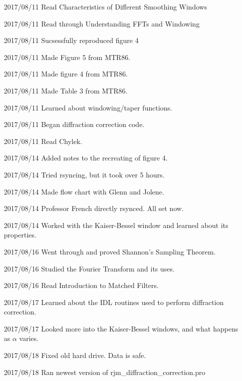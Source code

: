 \documentclass[crop=false,class=article,oneside]{standalone}
\begin{document}
\begin{enumerate}[leftmargin=55pt]
            \item[2017/08/11] Read Characteristics of
                              Different Smoothing Windows
            \item[2017/08/11] Read through Understanding FFTs
                              and Windowing
            \item[2017/08/11] Sucsessfully reproduced figure 4
            \item[2017/08/11] Made Figure 5 from MTR86.
            \item[2017/08/11] Made figure 4 from MTR86.
            \item[2017/08/11] Made Table 3 from MTR86.
            \item[2017/08/11] Learned about windowing/taper functions.
            \item[2017/08/11] Began diffraction correction code.
            \item[2017/08/11] Read Chylek.
            \item[2017/08/14] Added notes to the recreating
                              of figure 4.
            \item[2017/08/14] Tried rsyncing, but it took over 5 hours.
            \item[2017/08/14] Made flow chart with Glenn and Jolene.
            \item[2017/08/14] Professor French directly rsynced. All set now.
            \item[2017/08/14] Worked with the Kaiser-Bessel window and
                              learned about its properties.
            \item[2017/08/16] Went through and proved
                              Shannon's Sampling Theorem.
            \item[2017/08/16] Studied the Fourier Transform
                              and its uses.
            \item[2017/08/16] Read Introduction to Matched Filters.
            \item[2017/08/17] Learned about the IDL routines used to
                              perform diffraction correction.
            \item[2017/08/17] Looked more into the Kaiser-Bessel windows,
                              and what happens as $\alpha$ varies.
            \item[2017/08/18] Fixed old hard drive. Data is safe.
            \item[2017/08/18] Ran newest version of
                              rjm\_diffraction\_correction.pro

\end{enumerate}
\end{document}
